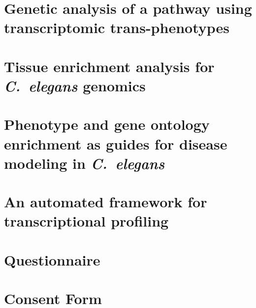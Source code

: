 \documentclass[12pt]{caltech_thesis}
\newcommand{\cel}{\emph{C.~elegans}}
\begin{document}
\chapter{Genetic analysis of a pathway using transcriptomic trans-phenotypes}
\begin{refsection}
\end{refsection}

\chapter{Tissue enrichment analysis for \cel{} genomics}
\begin{refsection}
  
  \printbibliography[heading=subbibliography]
\end{refsection}

\chapter{Phenotype and gene ontology enrichment as guides for disease modeling
         in \cel{}}
\begin{refsection}
  
  \printbibliography[heading=subbibliography]
\end{refsection}

\chapter{An automated framework for transcriptional profiling}
\begin{refsection}
\end{refsection}




\appendix

\chapter{Questionnaire}
\chapter{Consent Form}

\printindex

\theendnotes{}

{}
\end{document}

